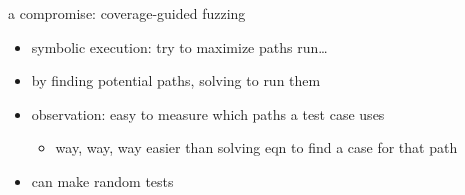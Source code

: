 

\begin{frame}{a compromise: coverage-guided fuzzing}
    \begin{itemize}
    \item symbolic execution: try to maximize paths run\ldots
    \item by finding potential paths, solving to run them
    \vspace{.5cm}
    \item observation: easy to measure which paths a test case uses
        \begin{itemize}
        \item way, way, way easier than solving eqn to find a case for that path
        \end{itemize}
    \item can make random tests 
    \end{itemize}
\end{frame}


